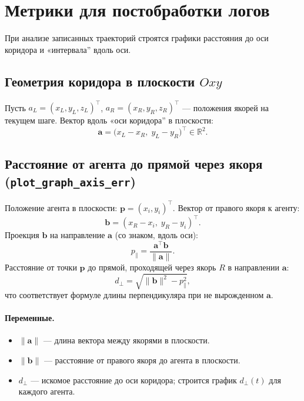 \documentclass[12pt,a4paper]{article}
\begin{document}
\section{Метрики для постобработки логов}

При анализе записанных траекторий строятся графики расстояния до оси коридора и «интервала'' вдоль оси.

\subsection{Геометрия коридора в плоскости $Oxy$}

Пусть $a_L = (x_L, y_L, z_L)^\top$, $a_R = (x_R, y_R, z_R)^\top$ --- положения якорей на текущем шаге. Вектор вдоль «оси коридора'' в плоскости:
\begin{equation}
  \mathbf{a} = \bigl(x_L - x_R,\; y_L - y_R\bigr)^\top \in \mathbb{R}^2.
\end{equation}

\subsection{Расстояние от агента до прямой через якоря (\texttt{plot\_graph\_axis\_err})}

Положение агента в плоскости: $\mathbf{p} = (x_i, y_i)^\top$. Вектор от правого якоря к агенту:
\begin{equation}
  \mathbf{b} = (x_R - x_i,\; y_R - y_i)^\top.
\end{equation}
Проекция $\mathbf{b}$ на направление $\mathbf{a}$ (со знаком, вдоль оси):
\begin{equation}
  p_{\parallel} = \frac{\mathbf{a}^\top \mathbf{b}}{\|\mathbf{a}\|}.
\end{equation}
Расстояние от точки $\mathbf{p}$ до прямой, проходящей через якорь $R$ в направлении $\mathbf{a}$:
\begin{equation}
  d_\perp = \sqrt{\|\mathbf{b}\|^2 - p_{\parallel}^2},
\end{equation}
что соответствует формуле длины перпендикуляра при не вырожденном $\mathbf{a}$.

\paragraph{Переменные.}
\begin{itemize}
  \item $\|\mathbf{a}\|$ --- длина вектора между якорями в плоскости.
  \item $\|\mathbf{b}\|$ --- расстояние от правого якоря до агента в плоскости.
  \item $d_\perp$ --- искомое расстояние до оси коридора; строится график $d_\perp(t)$ для каждого агента.
\end{itemize}
\end{document}
